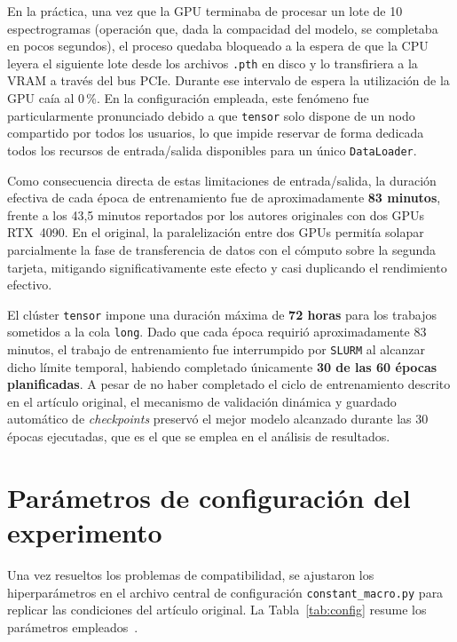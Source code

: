 \documentclass[11pt,spanish,listoffigures,listoftables]{tfgetsinf}
\begin{document}
En la práctica, una vez que la GPU terminaba de procesar un lote de 10
espectrogramas (operación que, dada la compacidad del modelo, se completaba en
pocos segundos), el proceso quedaba bloqueado a la espera de que la CPU leyera
el siguiente lote desde los archivos \texttt{.pth} en disco y lo transfiriera a
la VRAM a través del bus PCIe. Durante ese intervalo de espera la utilización
de la GPU caía al 0\,\%. En la configuración empleada, este fenómeno fue
particularmente pronunciado debido a que \texttt{tensor} solo dispone de un
nodo compartido por todos los usuarios, lo que impide reservar de forma
dedicada todos los recursos de entrada/salida disponibles para un único
\texttt{DataLoader}.

Como consecuencia directa de estas limitaciones de entrada/salida, la duración
efectiva de cada época de entrenamiento fue de aproximadamente \textbf{83
minutos}, frente a los 43,5 minutos reportados por los autores originales con
dos GPUs RTX~4090. En el  original, la paralelización
entre dos GPUs permitía solapar parcialmente la fase de transferencia de datos
con el cómputo sobre la segunda tarjeta, mitigando significativamente este
efecto y casi duplicando el rendimiento efectivo.

El clúster \texttt{tensor} impone una duración máxima de \textbf{72 horas} para
los trabajos sometidos a la cola \texttt{long}. Dado que cada época requirió
aproximadamente 83 minutos, el trabajo de entrenamiento fue interrumpido por
\texttt{SLURM} al alcanzar dicho límite temporal, habiendo completado únicamente
\textbf{30 de las 60 épocas planificadas}. A pesar de no haber completado el
ciclo de entrenamiento descrito en el artículo original, el mecanismo de
validación dinámica y guardado automático de \textit{checkpoints} preservó el
mejor modelo alcanzado durante las 30 épocas ejecutadas, que es el que se
emplea en el análisis de resultados.

\section{Parámetros de configuración del experimento}

Una vez resueltos los problemas de compatibilidad, se ajustaron los
hiperparámetros en el archivo central de configuración
\texttt{constant\_macro.py} para replicar las condiciones del artículo original.
La Tabla~\ref{tab:config} resume los parámetros empleados~\cite{wang2025mftfilm}.
\end{document}
